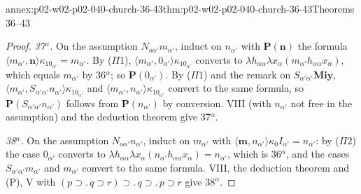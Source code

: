 \begin{annexitem}{annex:p02-w02-p02-040-church-36-43}{thm:p02-w02-p02-040-church-36-43}{Theorems 36--43}
\begin{proof}
\emph{37\(^\alpha\).}  On the assumption \(N_{o\alpha'}m_{\alpha'}\), induct on
\(n_{\alpha'}\) with \(\mathbf P(\mathbf n)\) the formula
\(\langle m_{\alpha'},\mathbf n\rangle\kappa_10_{\alpha'}=m_{\alpha'}\).  By
(\(\Pi\)1), \(\langle m_{\alpha'},0_{\alpha'}\rangle\kappa_10_{\alpha'}\) converts to
\(\lambda h_{\alpha\alpha}\lambda x_\alpha(m_{\alpha'}h_{\alpha\alpha}x_\alpha)\),
which equals \(m_{\alpha'}\) by 36\(^\alpha\); so \(\mathbf P(0_{\alpha'})\).
By (\(\Pi\)1) and the remark on \(S_{\alpha'\alpha'}\mathbf M\mathbf i\mathbf y\),
\(\langle m_{\alpha'},S_{\alpha'\alpha'}n_{\alpha'}\rangle\kappa_10_{\alpha'}\) and
\(\langle m_{\alpha'},n_{\alpha'}\rangle\kappa_10_{\alpha'}\) convert to the same
formula, so \(\mathbf P(S_{\alpha'\alpha'}n_{\alpha'})\) follows from
\(\mathbf P(n_{\alpha'})\) by conversion.  VIII (with \(n_{\alpha'}\) not free in
the assumption) and the deduction theorem give 37\(^\alpha\).

\emph{38\(^\alpha\).}  On the assumption \(N_{o\alpha'}n_{\alpha'}\), induct on
\(m_{\alpha'}\) with
\(\langle\mathbf m,n_{\alpha'}\rangle\kappa_0I_{\alpha'}=n_{\alpha'}\): by (\(\Pi\)2)
the case \(0_{\alpha'}\) converts to
\(\lambda h_{\alpha\alpha}\lambda x_\alpha(n_{\alpha'}h_{\alpha\alpha}x_\alpha)=n_{\alpha'}\),
which is 36\(^\alpha\), and the cases \(S_{\alpha'\alpha'}m_{\alpha'}\) and
\(m_{\alpha'}\) convert to the same formula.  VIII, the deduction theorem and
(P), V with \((p\supset.\,q\supset r)\supset.\,q\supset.\,p\supset r\) give 38\(^\alpha\).


\end{proof}
\end{annexitem}
